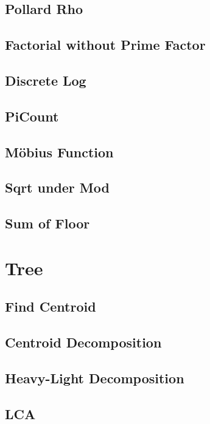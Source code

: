 \subsection{Pollard Rho}

\subsection{Factorial without Prime Factor}

\subsection{Discrete Log}

\subsection{PiCount}

\subsection{Möbius Function}

\subsection{Sqrt under Mod}

\subsection{Sum of Floor}


\section{Tree}
\subsection{Find Centroid}

\subsection{Centroid Decomposition}

\subsection{Heavy-Light Decomposition}

\subsection{LCA}

